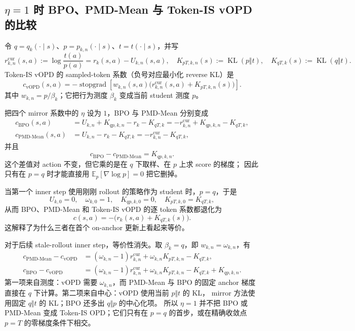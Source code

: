 \documentclass[lang=cn,scheme=chinese,openany]{../book/elegantbook}
\newcommand{\sg}{\operatorname{stopgrad}}
\begin{document}
\subsection{$\eta=1$ 时 BPO、PMD-Mean 与 Token-IS vOPD 的比较}
\label{subsec:ch2-opd-eta-one-vopd}

令 $q=q_k(\cdot\mid s)$、$p=p_{k,n}(\cdot\mid s)$、$t=t(\cdot\mid s)$，并写
\begin{equation}
r_{k,n}^{\mathrm{cur}}(s,a):=\log\frac{t(a)}{p(a)}=r_k(s,a)-U_{k,n}(s,a),
\quad
K_{pT,k,n}(s):=\operatorname{KL}(p\Vert t),
\quad
K_{qT,k}(s):=\operatorname{KL}(q\Vert t).
\end{equation}
Token-IS vOPD 的 sampled-token 系数（负号对应最小化 reverse KL）是
\begin{equation}
\label{eq:ch2-vopd-token-is-coef}
c_{\mathrm{vOPD}}(s,a)
=-\sg\!\left[
w_{k,n}(s,a)\bigl(r_{k,n}^{\mathrm{cur}}(s,a)+K_{pT,k,n}(s)\bigr)
\right].
\end{equation}
其中 $w_{k,n}=p/\beta_k$；它把行为测度 $\beta_k$ 变成当前 student 测度 $p$。

把四个 mirror 系数中的 $\eta$ 设为 $1$，BPO 与 PMD-Mean 分别变成
\begin{align}
c_{\mathrm{BPO}}(s,a)
&=U_{k,n}+K_{qp,k,n}-r_k-K_{qT,k}
 =-r_{k,n}^{\mathrm{cur}}+K_{qp,k,n}-K_{qT,k},
\label{eq:ch2-bpo-eta-one}\\
c_{\mathrm{PMD\text{-}Mean}}(s,a)
&=U_{k,n}-r_k-K_{qT,k}
 =-r_{k,n}^{\mathrm{cur}}-K_{qT,k},
\label{eq:ch2-pmd-mean-eta-one}
\end{align}
并且
\begin{equation}
c_{\mathrm{BPO}}-c_{\mathrm{PMD\text{-}Mean}}=K_{qp,k,n}.
\end{equation}
这个差值对 action 不变，但它乘的是在 $q$ 下取样、在 $p$ 上求 score 的梯度； 因此只有在 $p=q$ 时才能直接用 $\mathbb E_p[\nabla\log p]=0$ 把它删掉。

当第一个 inner step 使用刚刚 rollout 的策略作为 student 时，$p=q$，于是
\begin{equation}
U_{k,0}=0,\quad \omega_{k,0}=1,\quad
K_{qp,k,0}=0,\quad K_{pT,k,0}=K_{qT,k},
\end{equation}
从而 BPO、PMD-Mean 和 Token-IS vOPD 的逐 token 系数都退化为
\begin{equation}
c(s,a)=-\bigl(r_k(s,a)+K_{qT,k}(s)\bigr).
\end{equation}
这解释了为什么三者在首个 on-anchor 更新上看起来等价。

对于后续 stale-rollout inner step，等价性消失。取 $\beta_k=q$，即 $w_{k,n}=\omega_{k,n}$，有
\begin{align}
c_{\mathrm{PMD\text{-}Mean}}-c_{\mathrm{vOPD}}
&=(\omega_{k,n}-1)r_{k,n}^{\mathrm{cur}}
 +\omega_{k,n}K_{pT,k,n}-K_{qT,k},\\
c_{\mathrm{BPO}}-c_{\mathrm{vOPD}}
&=(\omega_{k,n}-1)r_{k,n}^{\mathrm{cur}}
 +\omega_{k,n}K_{pT,k,n}-K_{qT,k}
 +K_{qp,k,n}.
\end{align}
第一项来自测度：vOPD 需要 $\omega_{k,n}$，而 PMD-Mean 与 BPO 的固定 anchor 梯度直接在 $q$ 下计算。第二项来自中心：vOPD 使用当前 $p\Vert t$ 的 KL， mirror 方法使用固定 $q\Vert t$ 的 KL；BPO 还多出 $q\Vert p$ 的中心化项。 所以 $\eta=1$ 并不把 BPO 或 PMD-Mean 变成 Token-IS OPD；它们只有在 $p=q$ 的首步，或在精确收敛点 $p=T$ 的零梯度条件下相交。
\end{document}
